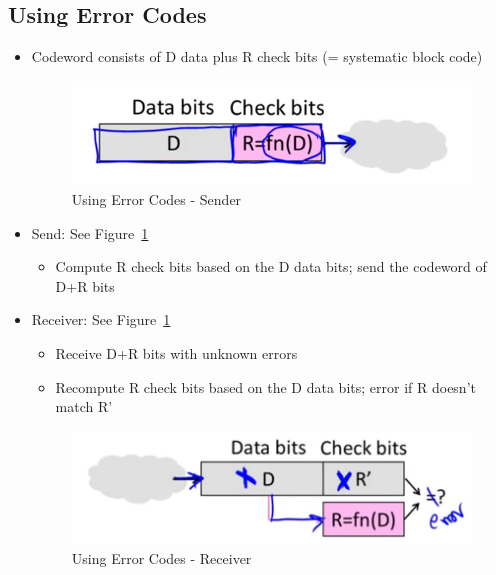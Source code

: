 \documentclass[12pt]{ctexart}   %
\begin{document}
	\subsection{Using Error Codes}
	\begin{itemize}
		\item Codeword consists of D data plus R  check bits (= systematic block code) 
		\begin{figure}[h!] %
		\centering
		 \includegraphics[scale=0.7]{images/2-8-2}
		\caption{Using Error Codes - Sender}
		 \label{fig:2-8-2}
		 \end{figure}	
		 
		\item Send:    See Figure~\ref{fig:2-8-2}
		\begin{itemize}
			\item Compute R check bits based on the D data bits; send the codeword of D+R bits
		\end{itemize}
		
		\item  Receiver:    See Figure~\ref{fig:2-8-2}
		\begin{itemize}
			\item Receive D+R bits with unknown errors
			\item Recompute R check bits based on the D data bits; error if R doesn't match R'
		\end{itemize}
		
		\begin{figure}[h!] %
		\centering
		 \includegraphics[scale=0.7]{images/2-8-3}
		\caption{Using Error Codes - Receiver}
		 \label{fig:2-8-3}
		 \end{figure}
		 
	\end{itemize}
	
\end{document}
